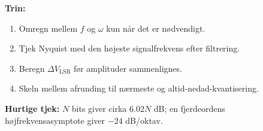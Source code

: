 \textbf{Trin:}
\begin{enumerate}
    \item Omregn mellem \(f\) og \(\omega\) kun når det er nødvendigt.
    \item Tjek Nyquist med den højeste signalfrekvens efter filtrering.
    \item Beregn \(\Delta V_{\mathrm{LSB}}\) før amplituder sammenlignes.
    \item Skeln mellem afrunding til nærmeste og altid-nedad-kvantisering.
\end{enumerate}

\textbf{Hurtige tjek:} \(N\) bits giver cirka \(6.02N\) dB; en fjerdeordens højfrekvensasymptote giver \(-24\) dB/oktav.
